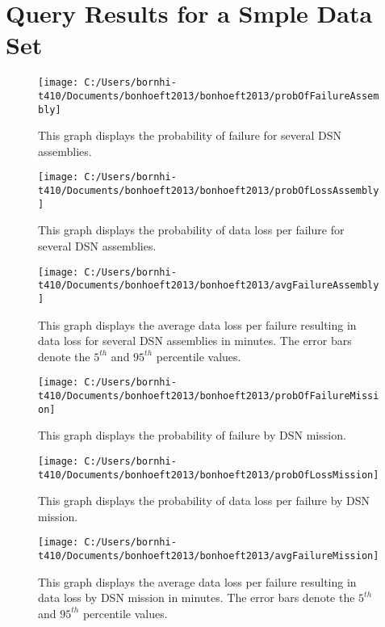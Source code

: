 \documentclass[aps,twocolumn,nobalancelastpage,amsmath,amssymb,
nofootinbib,superscriptaddress, ]{revtex4}
\begin{document}
\clearpage
\appendix

\section{Query Results for a Smple Data Set}

\begin{figure}[h]
\texttt{[image: C:/Users/bornhi-t410/Documents/bonhoeft2013/bonhoeft2013/probOfFailureAssembly]}
\caption{This graph displays the probability of failure for several DSN assemblies.\label{fig:fig2}}
\end{figure}

\begin{figure}[h]
\texttt{[image: C:/Users/bornhi-t410/Documents/bonhoeft2013/bonhoeft2013/probOfLossAssembly]}
\caption{This graph displays the probability of data loss per failure for several DSN assemblies.\label{fig:fig3}}
\end{figure}

\begin{figure}[h]
\texttt{[image: C:/Users/bornhi-t410/Documents/bonhoeft2013/bonhoeft2013/avgFailureAssembly]}
\caption{This graph displays the average data loss per failure resulting in data loss for several DSN assemblies in minutes. The error bars denote the $5^{th}$ and $95^{th}$ percentile values. \label{fig:fig4}}
\end{figure}

\begin{figure}[h]
\texttt{[image: C:/Users/bornhi-t410/Documents/bonhoeft2013/bonhoeft2013/probOfFailureMission]}
\caption{This graph displays the probability of failure by DSN mission.\label{fig:fig5}}
\end{figure}

\begin{figure}[h]
\texttt{[image: C:/Users/bornhi-t410/Documents/bonhoeft2013/bonhoeft2013/probOfLossMission]}
\caption{This graph displays the probability of data loss per failure by DSN mission.\label{fig:fig6}}
\end{figure}

\begin{figure}[h]
\texttt{[image: C:/Users/bornhi-t410/Documents/bonhoeft2013/bonhoeft2013/avgFailureMission]}
\caption{This graph displays the average data loss per failure resulting in data loss by DSN mission in minutes. The error bars denote the $5^{th}$ and $95^{th}$ percentile values. \label{fig:fig7}}
\end{figure}
\end{document}
